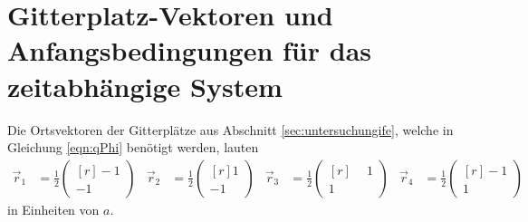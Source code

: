 \newpage

\section{Gitterplatz-Vektoren und Anfangsbedingungen für das zeitabhängige System}

Die Ortsvektoren der Gitterplätze aus Abschnitt \ref{sec:untersuchungife}, welche in Gleichung \eqref{eqn:qPhi} benötigt werden, lauten
\begin{align}
  \vec{r}_1 &= \frac12
  \begin{pmatrix*}[r]
     -1 \\
     -1
  \end{pmatrix*} &
  \vec{r}_2 &= \frac12
  \begin{pmatrix*}[r]
     1 \\
     -1
  \end{pmatrix*} &
  \vec{r}_3 &= \frac12
  \begin{pmatrix*}[r]
     \phantom{-}1 \\
     1
  \end{pmatrix*} &
  \vec{r}_4 &= \frac12
  \begin{pmatrix*}[r]
     -1 \\
     1
  \end{pmatrix*}
  \label{eqn:gitterplatzvektor}
\end{align}
in Einheiten von $a$.

